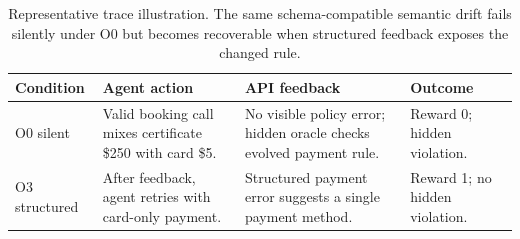 \begin{table}[t]
\centering
\scriptsize
\caption{Representative trace illustration. The same schema-compatible semantic drift fails silently under O0 but becomes recoverable when structured feedback exposes the changed rule.}
\label{tab:trace-case-box}
\begin{tabular}{@{}p{}p{}p{}p{}@{}}
\toprule
Condition & Agent action & API feedback & Outcome \\
\midrule
O0 silent & Valid booking call mixes certificate \$250 with card \$5. & No visible policy error; hidden oracle checks evolved payment rule. & Reward 0; hidden violation. \\
O3 structured & After feedback, agent retries with card-only payment. & Structured payment error suggests a single payment method. & Reward 1; no hidden violation. \\
\bottomrule
\end{tabular}
\end{table}
